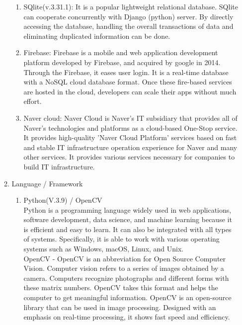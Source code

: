 \documentclass[conference]{IEEEtran}
\begin{document}
\begin{enumerate}[label=\arabic*.]
\begin{enumerate}[label=\alph*.]
\begin{enumerate}[label=\roman*.]
            \item {\large{SQlite(v.3.31.1): It is a popular lightweight relational database. SQlite can cooperate concurrently with Django (python) server. By directly accessing the database, handling the overall transactions of data and eliminating duplicated information can be done. }} \\
            \item {\large{Firebase: Firebase is a mobile and web application development platform developed by Firebase, and acquired by google in 2014. Through the Firebase, it eases user login. It is a real-time database with a NoSQL cloud database format. Once these fire-based services are hosted in the cloud, developers can scale their apps without much effort. }} \\
            \item {\large{Naver cloud: Naver Cloud is Naver's IT subsidiary that provides all of Naver's technologies and platforms as a cloud-based One-Stop service. It provides high-quality 'Naver Cloud Platform' services based on fast and stable IT infrastructure operation experience for Naver and many other services. It provides various services necessary for companies to build IT infrastructure. }} \\
        \end{enumerate}
        \item {\large{Language / Framework}} \\
        \begin{enumerate}[label=\roman*.]
            \item {\large{Python(V.3.9) / OpenCV}} \\
            Python is a programming language widely used in web applications, software development, data science, and machine learning because it is efficient and easy to learn. It can also be integrated with all types of systems. Specifically, it is able to work with various operating systems such as Windows, macOS, Linux, and Unix. \\
            OpenCV - OpenCV is an abbreviation for Open Source Computer Vision. Computer vision refers to a series of images obtained by a camera. Computers recognize photographs and different forms with these matrix numbers. OpenCV takes this format and helps the computer to get meaningful information. OpenCV is an open-source library that can be used in image processing. Designed with an emphasis on real-time processing, it shows fast speed and efficiency. \\

\end{enumerate}
\end{enumerate}
\end{enumerate}
\end{document}
